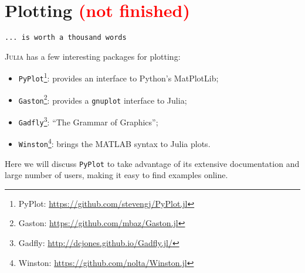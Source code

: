 \chapter{Plotting  \textcolor{red}{(not finished)}}
\vspace*{-1cm}
\begin{flushright}
\texttt{... is worth a thousand words}
\end{flushright}

\lettrine[nindent=0.35em,lhang=0.40,loversize=0.3]{J}{ulia} has a few interesting packages for plotting:

\begin{itemize}
 \item \texttt{PyPlot}\footnote{PyPlot: \url{https://github.com/stevengj/PyPlot.jl}}: provides an interface to Python's MatPlotLib;
 \item \texttt{Gaston}\footnote{Gaston: \url{https://github.com/mbaz/Gaston.jl}}: provides a \texttt{gnuplot} interface to Julia;
 \item \texttt{Gadfly}\footnote{Gadfly: \url{http://dcjones.github.io/Gadfly.jl/}}: ``The Grammar of Graphics'';
 \item \texttt{Winston}\footnote{Winston: \url{https://github.com/nolta/Winston.jl}}: brings the MATLAB syntax to Julia plots.
\end{itemize}

Here we will discuss \texttt{PyPlot} to take advantage of its extensive documentation and large number of users, making it easy to find examples online. 


% 